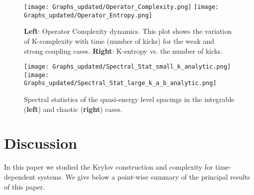 \documentclass[a4paper,12pt]{article}
\begin{document}
\begin{figure*}[htbp]
    \centering
    \texttt{[image: Graphs\_updated/Operator\_Complexity.png]}
    \texttt{[image: Graphs\_updated/Operator\_Entropy.png]}
    \caption{ \textbf{Left}: Operator Complexity dynamics. This plot shows the variation of K-complexity with time (number of kicks) for the weak and strong coupling cases. \textbf{Right}: K-entropy vs. the number of kicks.}
    \label{fig:6}
\end{figure*}

\begin{figure*}[htbp]
    \centering
    \texttt{[image: Graphs\_updated/Spectral\_Stat\_small\_k\_analytic.png]}
    \texttt{[image: Graphs\_updated/Spectral\_Stat\_large\_k\_a\_b\_analytic.png]}
    \caption{Spectral statistics of the quasi-energy level spacings in the integrable (\textbf{left}) and chaotic (\textbf{right}) cases.}
    \label{fig:8}
\end{figure*}


\section{Discussion} \label{summary}

In this paper we studied the Krylov construction and complexity for time-dependent systems. We give below a point-wise summary of the principal results of this paper.
\end{document}
